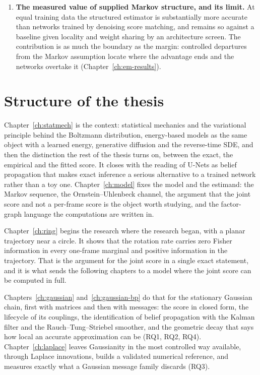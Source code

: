 \begin{enumerate}
  \item \textbf{The measured value of supplied Markov structure, and its
  limit.} At equal training data the structured estimator is substantially more
  accurate than networks trained by denoising score matching, and remains so
  against a baseline given locality and weight sharing by an architecture
  screen. The contribution is as much the boundary as the margin: controlled
  departures from the Markov assumption locate where the advantage ends and the
  networks overtake it (Chapter~\ref{ch:em-results}).
\end{enumerate}

\section{Structure of the thesis}

Chapter~\ref{ch:statmech} is the context: statistical mechanics and the
variational principle behind the Boltzmann distribution, energy-based models as
the same object with a learned energy, generative diffusion and the reverse-time
SDE, and then the distinction the rest of the thesis turns on, between the
exact, the empirical and the fitted score. It closes with the reading of U-Nets
as belief propagation that makes exact inference a serious alternative to a
trained network rather than a toy one. Chapter~\ref{ch:model} fixes the model
and the estimand: the Markov sequence, the Ornstein--Uhlenbeck channel, the
argument that the joint score and not a per-frame score is the object worth
studying, and the factor-graph language the computations are written in.

Chapter~\ref{ch:ring} begins the research where the research began, with a
planar trajectory near a circle. It shows that the rotation rate carries zero
Fisher information in every one-frame marginal and positive information in the
trajectory. That is the argument for the joint score in a single exact
statement, and it is what sends the following chapters to a model where the
joint score can be computed in full.

Chapters~\ref{ch:gaussian} and~\ref{ch:gaussian-bp} do that for the stationary
Gaussian chain, first with matrices and then with messages: the score in closed
form, the lifecycle of its couplings, the identification of belief propagation
with the Kalman filter and the Rauch--Tung--Striebel smoother, and the
geometric decay that says how local an accurate approximation can be
(RQ1, RQ2, RQ4). Chapter~\ref{ch:laplace} leaves Gaussianity in the most
controlled way available, through Laplace innovations, builds a validated
numerical reference, and measures exactly what a Gaussian message family
discards (RQ3).

